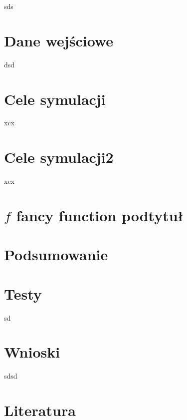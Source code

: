 \documentclass[a4paper, 11pt]{article}
\begin{document}
		
sds
	\section*{Dane wejściowe}
	\indent
	
	dsd
	\section*{Cele symulacji}
	\indent
	
xcx
	\section*{Cele symulacji2}
	\indent
	
	xcx
	\section*{$ f $ fancy function podtytuł}
	\indent
	\begin{figure}[H]%
	\end{figure}
	\section*{Podsumowanie}
	\indent
	

	\begin{figure}[bt]
	\end{figure}
	\section{Testy}
	\indent
	sd
	\section{Wnioski}
	\indent
	
	sdsd
	\section{Literatura}
	
\end{document}
